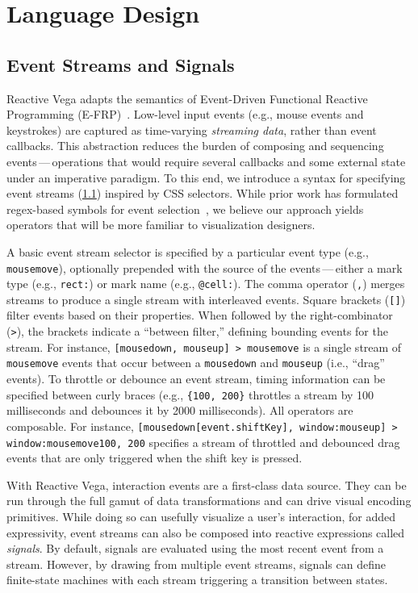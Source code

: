 \section{Language Design}
\label{sec:vg:primitives}
\subsection{Event Streams and Signals}

Reactive Vega adapts the semantics of Event-Driven Functional Reactive
Programming (E-FRP)~\cite{wan:efrp}. Low-level input events (e.g., mouse events
and keystrokes) are captured as time-varying \emph{streaming data}, rather than
event callbacks. This abstraction reduces the burden of composing and sequencing
events\,---\,operations that would require several callbacks and some external
state under an imperative paradigm. To this end, we introduce a syntax for
specifying event streams (\cref{}) inspired by CSS selectors.
While prior work has formulated regex-based symbols for event
selection~\cite{kin:proton++}, we believe our approach yields operators that
will be more familiar to visualization designers.

A basic event stream selector is specified by a particular event type (e.g.,
\texttt{mousemove}), optionally prepended with the source of the
events\,---\,either a mark type (e.g., \texttt{rect:}) or mark name (e.g.,
\texttt{@cell:}). The comma operator (\texttt{,}) merges streams to produce a
single stream with interleaved events. Square brackets (\texttt{[]}) filter
events based on their properties. When followed by the right-combinator
(\texttt{>}), the brackets indicate a ``between filter,'' defining bounding
events for the stream. For instance, \texttt{[mousedown, mouseup] > mousemove}
is a single stream of \texttt{mousemove} events that occur between a
\texttt{mousedown} and \texttt{mouseup} (i.e., ``drag'' events). To throttle or
debounce an event stream, timing information can be specified between curly
braces (e.g., \texttt{\{100, 200\}} throttles a stream by 100 milliseconds and
debounces it by 2000 milliseconds).  All operators are composable. For instance,
\texttt{[mousedown[event.shiftKey], window:mouseup] > window:mousemove{100,
200}} specifies a stream of throttled and debounced drag events that are only
triggered when the shift key is pressed.

With Reactive Vega, interaction events are a first-class data source. They can
be run through the full gamut of data transformations and can drive visual
encoding primitives. While doing so can usefully visualize a user's interaction,
for added expressivity, event streams can also be composed into reactive
expressions called \emph{signals}. By default, signals are evaluated using the
most recent event from a stream. However, by drawing from multiple event
streams, signals can define finite-state machines with each stream triggering a
transition between states.

